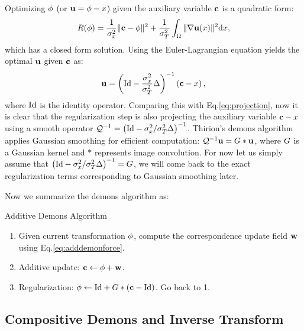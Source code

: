 \documentclass[letterpaper,12pt]{article}
\begin{document}
Optimizing $\phi$ (or $\mathbf{u} = \phi - x$) given the auxiliary variable $\mathbf{c}$ is a quadratic form: 
\begin{align}
R(\phi) = \frac{1}{\sigma_x^2} \|\mathbf{c} - \phi\|^2+\frac{1}{\sigma_T^2} \int_\Omega \| \nabla\mathbf{u}(x)\|^2 \text{d} x,
\end{align}
which has a closed form solution.  Using the Euler-Lagrangian equation yields the optimal $\mathbf{u}$ given $\mathbf{c}$ as:
\begin{align}
\mathbf{u} = \left( \text{Id} - \frac{\sigma_x^2}{\sigma_T^2} \Delta \right)^{-1} \left( \mathbf{c} - x \right),
\end{align}
where $\text{Id}$ is the identity operator. Comparing this with Eq.\ref{eq:projection}, now it is clear that the regularization step is also projecting the auxiliary variable $\mathbf{c}-x$ using a smooth operator 
$\mathcal{Q}^{-1} = \left( \text{Id} - {\sigma_x^2}/{\sigma_T^2} \Delta \right)^{-1}$. 
Thirion's demons algorithm applies Gaussian smoothing for efficient computation: $\mathcal{Q}^{-1} \mathbf{u} = {G} \ast \mathbf{u}$, where ${G}$ is a Gaussian kernel and $\ast$ represents image convolution. For now let us simply assume that $\left( \text{Id} - {\sigma_x^2}/{\sigma_T^2} \Delta \right)^{-1} = {G}$, we will come back to the exact regularization terms corresponding to Gaussian smoothing later.

Now we summarize the demons algorithm as:
\begin{algorithm}
\caption{Additive Demons Algorithm}
\label{alg:additivedemons}
\begin{enumerate}
\item{Given current transformation $\phi$, compute the correspondence update field $\mathbf{w}$ using Eq.\ref{eq:adddemonforce}. 
}
\item{Additive update: $\mathbf{c} \leftarrow \phi + \mathbf{w}$.
}
\item{Regularization: $\phi \leftarrow \text{Id} + {G} \ast (\mathbf{c} - \text{Id})$. Go back to 1.
}
\end{enumerate}
\end{algorithm}

\subsection{Compositive Demons and Inverse Transform}
\label{sec:compositivedemons}
\end{document}
